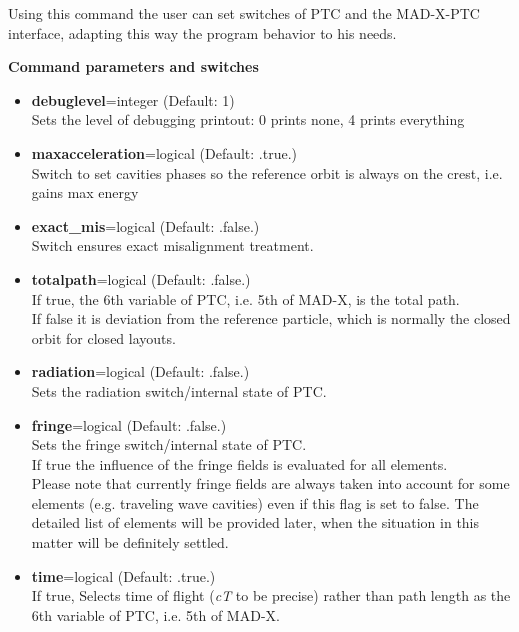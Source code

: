 Using this command the user can set switches of PTC and the MAD-X-PTC
interface, adapting this way the program behavior to his needs.   

{\bf Command parameters and switches}
\begin{itemize}
   \item {\bf debuglevel}=integer (Default: 1)\\
     Sets the level of debugging printout: 0 prints none, 4 prints everything   

   \item {\bf maxacceleration}=logical (Default: .true.)\\
     Switch to set cavities phases so the reference orbit is always on
     the crest, i.e. gains max energy    

   \item {\bf exact\_mis}=logical (Default: .false.)\\
     Switch ensures exact misalignment treatment.   

   \item {\bf totalpath}=logical  (Default: .false.)\\
     If true, the 6th variable of PTC, i.e. 5th of MAD-X, is the total
     path.  \\
     If false it is deviation from the reference particle,
     which is normally the closed orbit for closed layouts.    

   \item {\bf radiation}=logical (Default: .false.)\\    
     Sets the radiation switch/internal state of PTC.   

   \item {\bf fringe}=logical (Default: .false.)\\    
     Sets the fringe switch/internal state of PTC. \\ 
     If true the influence of the fringe fields is evaluated for all
     elements. \\       
     Please note that currently fringe fields are always taken into
     account for some elements (e.g. traveling wave cavities) even if
     this flag is set to false. The detailed list of elements
     will be provided later, when the situation in this matter will be
     definitely settled.    

   \item {\bf time}=logical (Default: .true.)\\  
     If true, Selects time of flight (\textit{cT} to be precise) rather
     than path length as the 6th variable of PTC, i.e. 5th of MAD-X.     
\end{itemize}


